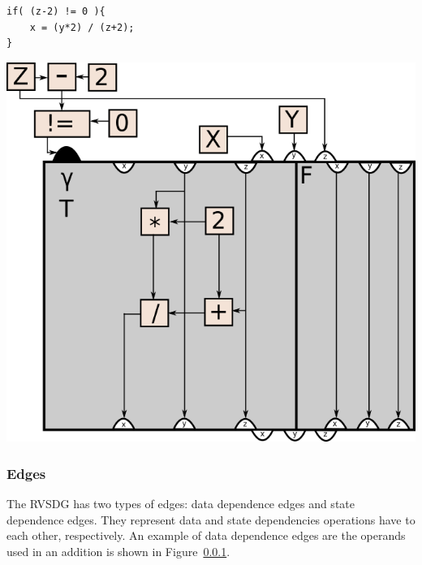 \begin{centering}
	\noindent\begin{minipage}{0.36\textwidth}
		\begin{CenteredBox}
		\begin{lstlisting}[label={lst:simple_if}, style=minipage_customcpp]
if( (z-2) != 0 ){
	x = (y*2) / (z+2);
}
		\end{lstlisting}
		\end{CenteredBox}
	\end{minipage}
	\noindent\begin{minipage}{0.55\textwidth}
		\captionsetup{type=figure}
		\includegraphics[width=\textwidth]{figures/simple_if_example}
	\end{minipage}
	\label{fig:simple_if}
\end{centering}

\subsubsection{Edges}

The RVSDG has two types of edges: data dependence edges and state dependence
edges. They represent data and state dependencies operations have to each other,
respectively. An example of data dependence edges are the operands used in an
addition is shown in Figure~\ref{}.

